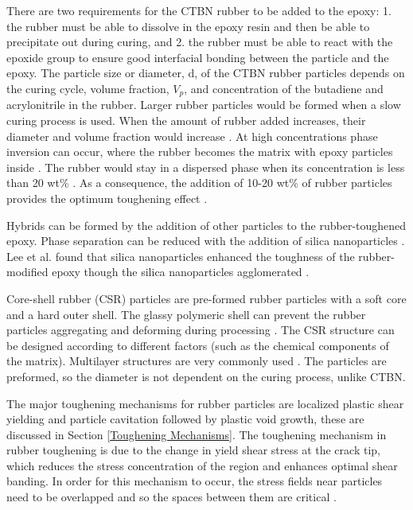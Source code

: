 \documentclass[numbers=noendperiod,chapterprefix=on]{icldt} %
\begin{document}
There are two requirements for the CTBN rubber to be added to the epoxy: 1. the rubber must be able to dissolve in the epoxy resin and then be able to precipitate out during curing, and 2. the rubber must be able to react with the epoxide group to ensure good interfacial bonding between the particle and the epoxy. The particle size or diameter, d, of the CTBN rubber particles depends on the curing cycle, volume fraction, $ V_{p} $, and concentration of the butadiene and acrylonitrile in the rubber. Larger rubber particles would be formed when a slow curing process is used. When the amount of rubber added increases, their diameter and volume fraction would increase \cite{Garg1988,Garg,Pan2005}.
At high concentrations phase inversion can occur, where the rubber becomes the matrix with epoxy particles inside \cite{Lee2006}. The rubber would stay in a dispersed phase when its concentration is less than 20 wt\% \cite{Bandyopadhyay1990a}. As a consequence, the addition of 10-20 wt\% of rubber particles provides the optimum toughening effect \cite{Bandyopadhyay1990a}. 

Hybrids can be formed by the addition of other particles to the rubber-toughened epoxy. Phase separation can be reduced with the addition of silica nanoparticles \cite{Bandyopadhyay1990a}. Lee et al. \cite{Lee2006} found that silica nanoparticles enhanced the toughness of the rubber-modified epoxy though the silica nanoparticles agglomerated \cite{Lee2006}. 

Core-shell rubber (CSR) particles are pre-formed rubber particles with a soft core and a hard outer shell. The glassy polymeric shell can prevent the rubber particles aggregating and deforming during processing \cite{Bagheri2009}. The CSR structure can be designed according to different factors (such as the chemical components of the matrix). Multilayer structures are very commonly used \cite{Giannakopoulos2011}. The particles are preformed, so the diameter is not dependent on the curing process, unlike CTBN. 


The major toughening mechanisms for rubber particles are localized plastic shear yielding and particle cavitation \cite{Bagheri2009} followed by plastic void growth, these are discussed in Section \ref{Toughening Mechanisms}. The toughening mechanism in rubber toughening is due to the change in yield shear stress at the crack tip, which reduces the stress concentration of the region and enhances optimal shear banding. In order for this mechanism to occur, the stress fields near particles need to be overlapped and so the spaces between them are critical \cite{Wise2000}. 
\end{document}

